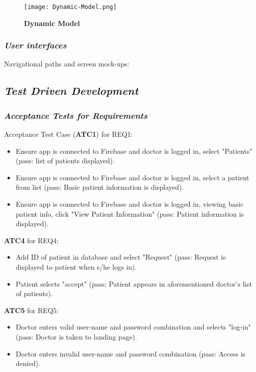 \documentclass[a4paper]{article}
\begin{document}
\FloatBarrier

\begin{figure}[h!]
\caption*{\textbf{Dynamic Model}}
\label{DncMdl}
\centering 
\texttt{[image: Dynamic-Model.png]}
\end{figure}

\FloatBarrier

\subsubsection{\textit{User interfaces}}

Navigational paths and screen mock-ups:

\subsection{\textit{Test Driven Development}}

\subsubsection{\textit{Acceptance Tests for Requirements}}

Acceptance Test Case (\textbf{ATC1}) for REQ1:

\begin{itemize}
\item Ensure app is connected to Firebase and doctor is logged in, select "Patients" (pass: list of patients displayed).
\item Ensure app is connected to Firebase and doctor is logged in, select a patient from list (pass: Basic patient information is displayed).
\item Ensure app is connected to Firebase and doctor is logged in, viewing basic patient info, click "View Patient Information" (pass: Patient information is displayed).
\end{itemize}

\textbf{ATC4} for REQ4:

\begin{itemize}
\item Add ID of patient in database and select "Request" (pass: Request is displayed to patient when s/he logs in).
\item Patient selects "accept" (pass: Patient appears in aforementioned doctor's list of patients).
\end{itemize}

\textbf{ATC5} for REQ5:

\begin{itemize}
\item Doctor enters valid user-name and password combination and selects "log-in" (pass: Doctor is taken to landing page).
\item Doctor enters invalid user-name and password combination (pass: Access is denied).
\end{itemize}
\end{document}
